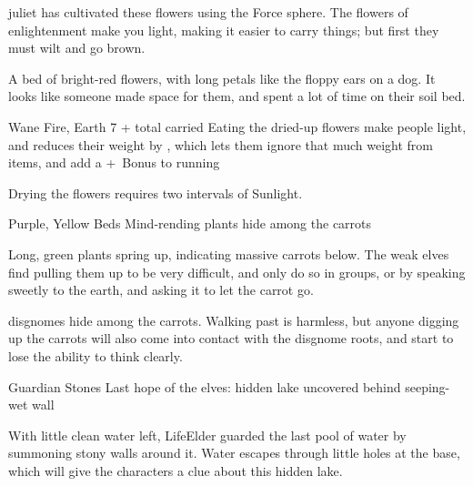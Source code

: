 
\Gls{juliet} has cultivated these flowers using the Force \gls{sphere}.
The flowers of enlightenment make you light, making it easier to carry things; but first they must wilt and go brown.

\begin{boxtext}
  A bed of bright-red flowers, with long petals like the floppy ears on a dog.
  It looks like someone made space for them, and spent a lot of time on their soil bed.
\end{boxtext}

\label{flowerOfEnlightenment}
  {}%
  {Wane}%
  {Fire, Earth}%
  {7 + total  carried}%
  {Eating the dried-up flowers make people light, and reduces their \gls{weight} by , which lets them ignore that much \gls{weight} from items, and add a +~Bonus to \gls{running}}%
  {\par%
    Drying the flowers requires two \glspl{interval} of Sunlight.
  }%

\showTalisman

{Purple, Yellow Beds}%
{Mind-rending plants hide among the carrots}%

Long, green plants spring up, indicating massive carrots below.
The weak elves find pulling them up to be very difficult, and only do so in groups, or by speaking sweetly to the earth, and asking it to let the carrot go.

\Glspl{disgnome} hide among the carrots.
Walking past is harmless, but anyone digging up the carrots will also come into contact with the \gls{disgnome} roots, and start to lose the ability to think clearly.

{Guardian Stones}%
{Last hope of the elves: hidden lake uncovered behind seeping-wet wall}%
\label{shadeDamn}


With little clean water left, \gls{LifeElder} guarded the last pool of water by summoning stony walls around it.
Water escapes through little holes at the base, which will give the characters a clue about this hidden lake.

